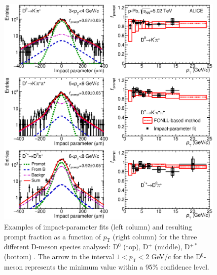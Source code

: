\documentclass[b5paper,10pt,twoside,oldstyle,classica]{toptesi}
\newcommand{\pt}{p_\text{T}}
\begin{document}
\begin{figure}[tb]
\begin{center}
\includegraphics[scale = 0.5]{ImpParFitAndRes.eps}
\caption{Examples of impact-parameter fits (left column) and resulting prompt fraction as a function of $\pt$ (right column) for the three different D-meson species analysed: D$^0$ (top), D$^+$ (middle), D$^{+*}$ (bottom) \cite{Adam:2016ich}. The arrow in the interval $1 <\pt < 2$ GeV/c for the D$^0$-meson represents the minimum value within a 95\% confidence level.}
\label{promptfrac_paper}
\end{center}

\end{figure}
\end{document}
